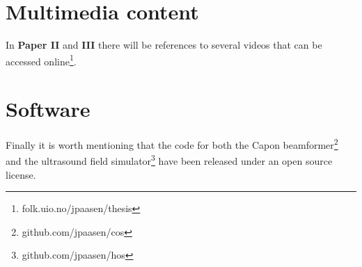 \section{Multimedia content}
In \textbf{Paper II} and \textbf{III} there will be references to several videos that can be accessed online\footnote{folk.uio.no/jpaasen/thesis}.

\section{Software}
Finally it is worth mentioning that the code for both the Capon beamformer\footnote{github.com/jpaasen/cos} and the ultrasound field simulator\footnote{github.com/jpaasen/hos} have been released under an open source license. 

\endinput